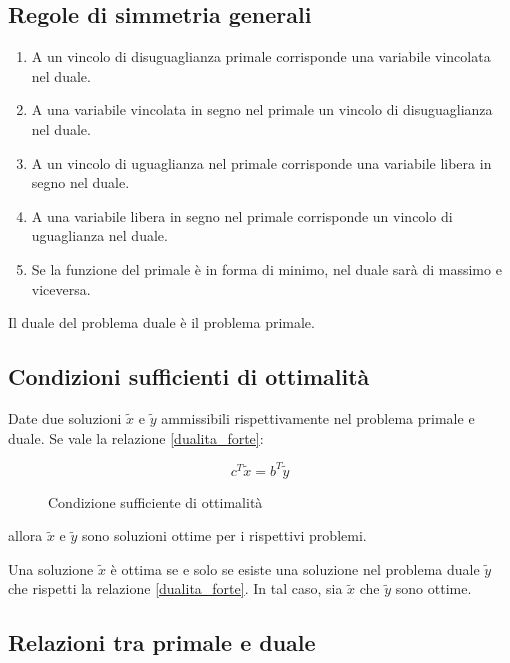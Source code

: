 \documentclass[\main/main.tex]{subfiles}
\begin{document}
\subsection{Regole di simmetria generali}

\begin{enumerate}
  \item A un vincolo di disuguaglianza primale corrisponde una variabile vincolata nel duale.
  \item A una variabile vincolata in segno nel primale un vincolo di disuguaglianza nel duale.
  \item A un vincolo di uguaglianza nel primale corrisponde una variabile libera in segno nel duale.
  \item A una variabile libera in segno nel primale corrisponde un vincolo di uguaglianza nel duale.
  \item Se la funzione del primale è in forma di minimo, nel duale sarà di massimo e viceversa.
\end{enumerate}

Il duale del problema duale è il problema primale.

\subsection{Condizioni sufficienti di ottimalità}

\begin{theorem}
  Date due soluzioni $\tilde{x}$ e $\tilde{y}$ ammissibili rispettivamente nel problema primale e duale. Se vale la relazione \ref{dualita_forte}:

  \begin{figure}
    \[
      c^T \tilde{x} = b^T \tilde{y}
    \]
    \caption{Condizione sufficiente di ottimalità}
  \end{figure}

  allora $\tilde{x}$ e $\tilde{y}$ sono soluzioni ottime per i rispettivi problemi.

  Una soluzione $\tilde{x}$ è ottima se e solo se esiste una soluzione nel problema duale $\tilde{y}$ che rispetti la relazione \ref{dualita_forte}. In tal caso, sia $\tilde{x}$ che $\tilde{y}$ sono ottime.
\end{theorem}

\subsection{Relazioni tra primale e duale}
\end{document}
